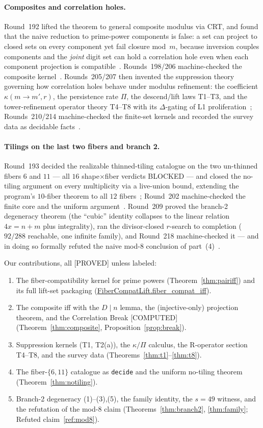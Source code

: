 \documentclass[11pt,a4paper]{article}
\theoremstyle{definition}
\begin{document}
\paragraph{Composites and correlation holes.}
Round~192 lifted the theorem to general composite modulus via CRT, and
found that the naive reduction to prime-power components is false: a set
can project to closed sets on every component yet fail closure mod~$m$,
because inversion couples components and the \emph{joint} digit set can
hold a correlation hole even when each component projection is
compatible~\cite{D192}. Rounds~198/206 machine-checked the composite
kernel~\cite{D198,D206}. Rounds~205/207 then invented the suppression
theory governing how correlation holes behave under modulus refinement:
the coefficient $\kappa(m\to m',r)$, the persistence rate $\Pi$, the
descend/lift laws T1--T3, and the tower-refinement operator theory
T4--T8 with its $\Delta$-gating of L1 proliferation~\cite{D205,D207};
Rounds~210/214 machine-checked the finite-set kernels and recorded the
survey data as decidable facts~\cite{D210,D214}.

\paragraph{Tilings on the last two fibers and branch 2.}
Round~193 decided the realizable thinned-tiling catalogue on the two
un-thinned fibers $6$ and $11$ --- all $16$ shape$\times$fiber verdicts
BLOCKED --- and closed the no-tiling argument on every multiplicity via
a live-union bound, extending the program's $10$-fiber theorem to all
$12$ fibers~\cite{D193}; Round~202 machine-checked the finite core and
the uniform argument~\cite{D202}. Round~209 proved the branch-2
degeneracy theorem (the ``cubic'' identity collapses to the linear
relation $4x=n+m$ plus integrality), ran the divisor-closed $r$-search
to completion ($92/288$ reachable, one infinite family), and Round~218
machine-checked it --- and in doing so formally refuted the naive
mod-$8$ conclusion of part~(4)~\cite{D209,D218}.

Our contributions, all [PROVED] unless labeled:
\begin{enumerate}
\item The fiber-compatibility kernel for prime powers
  (Theorem~\ref{thm:pairiff}) and its full lift-set packaging
  (\url{FiberCompatLift.fiber_compat_iff}).
\item The composite iff with the $D\mid n$ lemma, the (injective-only)
  projection theorem, and the Correlation Break [COMPUTED]
  (Theorem~\ref{thm:composite}, Proposition~\ref{prop:break}).
\item Suppression kernels (T1, T2(a)), the $\kappa/\Pi$ calculus, the
  R-operator section T4--T8, and the survey data
  (Theorems~\ref{thm:t1}--\ref{thm:t8}).
\item The fiber-$\{6,11\}$ catalogue as \texttt{decide} and the uniform
  no-tiling theorem (Theorem~\ref{thm:notiling}).
\item Branch-2 degeneracy (1)--(3),(5), the family identity, the $s=49$
  witness, and the refutation of the mod-$8$ claim
  (Theorems~\ref{thm:branch2}, \ref{thm:family}; Refuted
  claim~\ref{ref:mod8}).
\end{enumerate}
\end{document}
